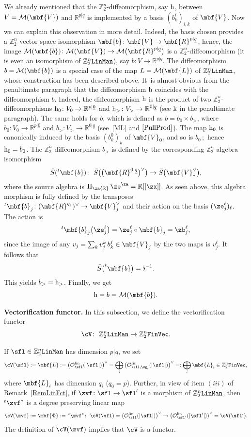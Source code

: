 \documentclass[pdftex]{sigma}%
\newcommand{\rmh}{\textnormal{h}}
\newcommand{\rmk}{\textnormal{k}}
\newcommand{\op}[1]{\operatorname{#1}}
\newcommand{\R}{{\mathbb R}}
\newcommand{\Z}{{\mathbb Z}}
\def\ul{\underline}
\def\cM{\cal M}
\def\cO{\mathcal{O}}
\def\cM{\mathcal{M}}
\def\ul{\underline}
\newcommand{\0}{\otimes}
\newcommand{\z}{\Z_2^n}
\numberwithin{equation}{section}
\begin{document}
We already mentioned that the $\z$-diffeomorphism, say $\rmh$, between $V=\cM(\mbf{V})$ and $\R^{p|\ul q}$ is implemented by a basis $(b^i_k)_{i,k}$ of $\mbf{V}$. Now we can explain this observation in more detail. Indeed, the basis chosen provides a $\z$-vector space isomorphism $\mbf{b}\colon \mbf{V}\to\mbf{R}^{p|\ul q}$, hence, the image $\cM(\mbf{b})\colon \cM(\mbf{V})\to \cM\big(\mbf{R}^{p|\ul q}\big)$ is a $\z$-diffeomorphism (it is even an isomorphism of $\z{\tt LinMan}$), say $b\colon V\to \R^{p|\ul q}$. The diffeomorphism $b=\cM(\mbf{b})$ is a special case of the map $L=\cM(\mbf{L})$ of $\z{\tt LinMan}$, whose construction has been described above. It~is almost obvious from the penultimate paragraph that the diffeomorphism $\rmh$ coincides with the diffeomorphism $b$. Indeed, the diffeomorphism $\rmh$ is the product of two $\z$-diffeomorphisms $\rmh_0\colon V_0\to\R^{p|\ul 0}$ and $\rmh_>\colon V_>\to\R^{0|\ul q}$ (see $\rmk$ in the penultimate paragraph). The same holds for $b$, which is defined as $b=b_0\times b_>$, where $b_0\colon V_0\to\R^{p|\ul 0}$ and $b_>\colon V_>\to \R^{0|\ul q}$ (see~\eqref{ML} and $\eqref{PullProd}$). The map $\rmh_0$ is canonically induced by the basis $(b^0_k)_k$ of $\mbf{V}_0$, and so is $b_0\,;$ hence
$\rmh_0=b_0$. The $\z$-diffeomorphism $b_>$ is defined by the corresponding $\z$-algebra isomorphism
\[
\bar{S}(^t\mbf{b})\colon\ \bar{S}\big(\big(\mbf{R}^{0|\ul q}\big)^\vee\big)\to \bar{S}\big(\mbf{V}_*^\vee\big),
\]
where the source algebra is $\Pi_\za\R\,\ze^\za=\R[[\zx]]$. As seen above, this algebra morphism is fully defined by the transposes $^t\mbf{b}_j\colon (\mbf{R}^{q_j})^\vee\to\mbf{V}_j^\vee$ and their action on the basis $(\ze^\ell_j)_\ell$. The action is
\[
^t\mbf{b}_j\big(\ze_j^\ell\big)=\ze_j^\ell\circ \mbf{b}_j=\zb_j^\ell,
\]
since the image of any $v_j=\sum_{k}v^k_j\, b_k^j\in\mbf{V}_j$ by the two maps is $v_j^\ell$. It follows that
\begin{gather}\label{GlobDiffcM1}
\bar{S}\big(^t\mbf{b}\big)=\flat^{-1}.
\end{gather}
This yields $b_>=\rmh_>$. Finally, we get
\begin{gather}\label{GlobDiffcM2}
\rmh=b=\cM(\mbf{b}).
\end{gather}

\noindent
{\bf Vectorification functor.} In this subsection, we define the vectorification functor
\[
\cV\colon\ \z{\tt LinMan}\to\z{\tt FinVec}.
\]


If $\sfl\in\z{\tt LinMan}$ has dimension $p|\ul q$, we set
\begin{gather}\label{DefVecFun}
\cV(\sfl):=\mbf{L}:=\big(\cO_\sfl^{\op{lin}}(|\sfl|)\big)^\vee =\bigoplus_i\big(\cO_{\sfl,\zg_i}^{\op{lin}}(|\sfl|)\big)^\vee=:\bigoplus_i\mbf{L}_i\in\z{\tt FinVec},
\end{gather}
where $\mbf{L}_i$ has dimension $q_i$ ($q_0=p$). Further, in view of item $(iii)$ of Remark~\ref{RemLinFct}, if $\zvf\colon \sfl\to\sfl'$ is a morphism of $\z\tt LinMan$, then $^t\zvf^*$ is a degree preserving linear map
\[
\cV(\zvf):=\mbf{\Phi}:=\,^t\zvf^*\colon\ \cV(\sfl) =\big(\cO_{\sfl}^{\op{lin}}(|\sfl|)\big)^\vee\to\big(\cO_{\sfl'}^{\op{lin}}(|\sfl'|)\big)^\vee =\cV(\sfl').
\]
The definition of $\cV(\zvf)$ implies that $\cV$ is a functor.
\end{document}
